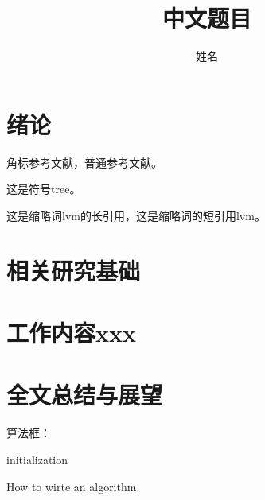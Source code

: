 \documentclass[master]{thesis-uestc}
\title{中文题目}{English Title} %
\author{姓名}{English Name} %
\begin{document}
\makecover %
\originalitydeclaration %
\begin{chineseabstract}

\end{chineseabstract}
\begin{englishabstract}

\end{englishabstract}

\thesistableofcontents %
\thesisfigurelist %
\thesistablelist %
\thesisglossarylist %
\thesissymbollist %

\chapter{绪\hspace{6pt}论}

角标参考文献，普通参考文献\cite{clerc2010discrete}。

这是符号\gls{tree}。

这是缩略词\acrlong{lvm}的长引用，这是缩略词的短引用\acrshort{lvm}。

\chapter{相关研究基础}
\chapter{工作内容xxx}
\chapter{全文总结与展望}

算法框：

\begin{algorithm}[H]
    initialization\;
    \caption{How to wirte an algorithm.}
\end{algorithm}
\end{document}
